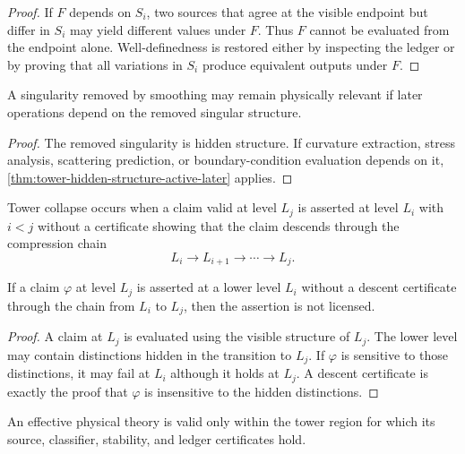 \begin{proof}
If $F$ depends on $S_i$, two sources that agree at the visible endpoint but differ in $S_i$ may yield different values under $F$. Thus $F$ cannot be evaluated from the endpoint alone. Well-definedness is restored either by inspecting the ledger or by proving that all variations in $S_i$ produce equivalent outputs under $F$.
\end{proof}

\begin{corollary}
\label{cor:singularities-can-return}
A singularity removed by smoothing may remain physically relevant if later operations depend on the removed singular structure.
\end{corollary}

\begin{proof}
The removed singularity is hidden structure. If curvature extraction, stress analysis, scattering prediction, or boundary-condition evaluation depends on it, \autoref{thm:tower-hidden-structure-active-later} applies.
\end{proof}

\begin{definition}
\label{def:tower-collapse}
Tower collapse occurs when a claim valid at level $L_j$ is asserted at level $L_i$ with $i<j$ without a certificate showing that the claim descends through the compression chain
$$
L_i\longrightarrow L_{i+1}\longrightarrow\cdots\longrightarrow L_j.
$$
\end{definition}

\begin{theorem}
\label{thm:tower-collapse-invalid-without-descent}
If a claim $\varphi$ at level $L_j$ is asserted at a lower level $L_i$ without a descent certificate through the chain from $L_i$ to $L_j$, then the assertion is not licensed.
\end{theorem}

\begin{proof}
A claim at $L_j$ is evaluated using the visible structure of $L_j$. The lower level may contain distinctions hidden in the transition to $L_j$. If $\varphi$ is sensitive to those distinctions, it may fail at $L_i$ although it holds at $L_j$. A descent certificate is exactly the proof that $\varphi$ is insensitive to the hidden distinctions.
\end{proof}

\begin{corollary}
\label{cor:effective-theories-tower-local}
An effective physical theory is valid only within the tower region for which its source, classifier, stability, and ledger certificates hold.
\end{corollary}

